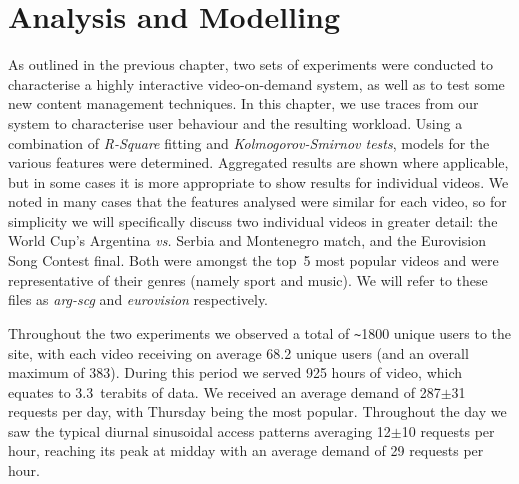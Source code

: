 \chapter{Analysis and Modelling}
\label{chap:evaluation}

As outlined in the previous chapter, two sets of experiments were conducted to characterise a highly interactive video-on-demand system, as well as to test some new content management techniques. In this chapter, we use traces from our system to characterise user behaviour and the resulting workload. Using a combination of {\em R-Square} fitting and {\em Kolmogorov-Smirnov tests}, models for the various features were determined. Aggregated results are shown where applicable, but in some cases it is more appropriate to show results for individual videos. We noted in many cases that the features analysed were similar for each video, so for simplicity we will specifically discuss two individual videos in greater detail: the World Cup's Argentina \emph{vs.} Serbia and Montenegro match, and the Eurovision Song Contest final. Both were amongst the top~5 most popular videos and were representative of their genres (namely sport and music). We will refer to these files as \emph{arg-scg} and \emph{eurovision} respectively.


Throughout the two experiments we observed a total of \verb+~+1800 unique users to the site, with each video receiving on average 68.2 unique users (and an overall maximum of 383). During this period we served 925 hours of video, which equates to 3.3~terabits of data. We received an average demand of 287$\pm$31 requests per day, with Thursday being the most popular. Throughout the day we saw the typical diurnal sinusoidal access patterns averaging 12$\pm$10 requests per hour, reaching its peak at midday with an average demand of 29 requests per hour.

